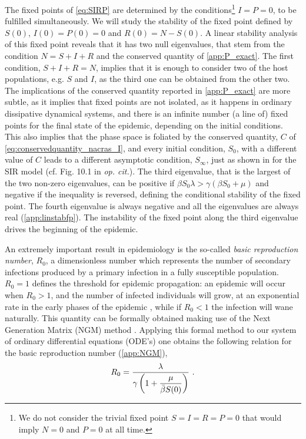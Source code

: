 The fixed points of \cref{eq:SIRP} are determined by the
conditions\footnote{We do not consider the trivial fixed point $S=I=R=P=0$ that
    would imply $N=0$ and $P=0$ at all time.}
$I=P=0$, to be fulfilled simultaneously.
We will study the stability of the fixed point defined by $S(0)$,
$I(0)=P(0)=0$ and $R(0)=N-S(0)$.
A linear stability analysis of this fixed point reveals that it has two
null eigenvalues, that stem from the condition $N=S+I+R$ and the conserved
quantity of \cref{app:P_exact}.
The first condition, $S+I+R=N$, implies that it is enough to consider two
of the host populations, e.g. $S$ and $I$, as the third one can be obtained
from the other two. The implications of the conserved quantity reported in
\cref{app:P_exact} are more subtle, as it implies that fixed points are not
isolated, as it happens in ordinary dissipative dynamical systems, and there is
an infinite number (a line of) fixed points for the final state of the
epidemic, depending on the initial conditions. This also implies that the phase
space is foliated by the conserved quantity, $C$ of
\cref{eq:conservedquantity_nacras_I}, and every initial condition, $S_0$, with
a
different value of $C$ leads to a different asymptotic condition, $S_{\infty}$,
just as shown in \cite{Murray_book} for the SIR model (cf. Fig. 10.1 in
\textit{op. cit.}).
The third eigenvalue, that is the largest of the two non-zero eigenvalues,
can be positive if $\beta S_0 \lambda>\gamma(\beta S_0+\mu)$ and negative if
the inequality is reversed, defining the conditional stability of the fixed
point. The fourth eigenvalue is always negative and all the eigenvalues are
always real (\cref{app:linstabfp}).
The instability of the fixed point along the third eigenvalue drives the
beginning of the epidemic.

An extremely important result in epidemiology is the so-called
\textit{basic reproduction number}, $R_0$, a dimensionless number which
represents the number of secondary infections produced by a primary infection
in a fully susceptible population. $R_0=1$ defines the threshold for epidemic
propagation: an epidemic will occur when $R_0>1$, and the number of infected
individuals will grow, at an exponential rate in the early phases of the
epidemic \cite{Castro2020}, while if $R_0<1$ the infection will wane
naturally.
This quantity can be formally obtained making use of the Next Generation
Matrix (NGM) method \cite{Theory_next_gen_matrix, Diekmann2010}. Applying this
formal method to our system of ordinary differential equations (ODE's) one
obtains the following relation for the basic reproduction number
(\cref{app:NGM}),
\begin{equation}\label{eq:R_0_SIRP}
    R_0=\frac{\lambda}{\gamma\left(1+\displaystyle\frac{\mu}{\bar{\beta}
                S(0)}\right)} \ .
\end{equation}

